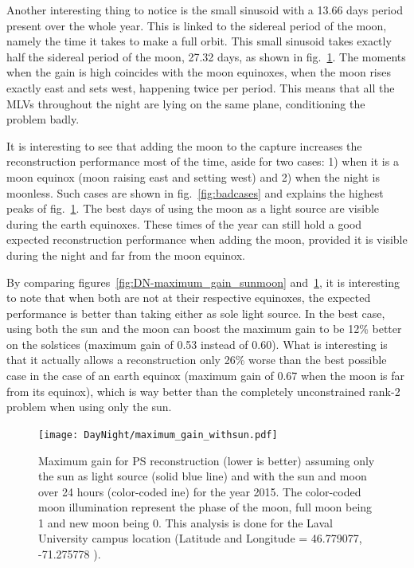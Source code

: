 Another interesting thing to notice is the small sinusoid with a 13.66 days period present over the whole year. This is linked to the sidereal period of the moon, namely the time it takes to make a full orbit. This small sinusoid takes exactly half the sidereal period of the moon, 27.32 days, as shown in fig.~\ref{fig:DN-maximum_gain}. The moments when the gain is high coincides with the moon equinoxes, when the moon rises exactly east and sets west, happening twice per period. This means that all the MLVs throughout the night are lying on the same plane, conditioning the problem badly.

It is interesting to see that adding the moon to the capture increases the reconstruction performance most of the time, aside for two cases: 1) when it is a moon equinox (moon raising east and setting west) and 2) when the night is moonless. Such cases are shown in fig.~\ref{fig:badcases} and explains the highest peaks of fig.~\ref{fig:DN-maximum_gain}. The best days of using the moon as a light source are visible during the earth equinoxes. These times of the year can still hold a good expected reconstruction performance when adding the moon, provided it is visible during the night and far from the moon equinox.

By comparing figures~\ref{fig:DN-maximum_gain_sunmoon} and~\ref{fig:DN-maximum_gain}, it is interesting to note that when both are not at their respective equinoxes, the expected performance is better than taking either as sole light source. In the best case, using both the sun and the moon can boost the maximum gain to be 12\% better on the solstices (maximum gain of 0.53 instead of 0.60). What is interesting is that it actually allows a reconstruction only 26\% worse than the best possible case in the case of an earth equinox (maximum gain of 0.67 when the moon is far from its equinox), which is way better than the completely unconstrained rank-2 problem when using only the sun.

\begin{figure}
\centering
\texttt{[image: DayNight/maximum\_gain\_withsun.pdf]}
\caption{Maximum gain for PS reconstruction (lower is better) assuming only the sun as light source (solid blue line) and with the sun and moon over 24 hours (color-coded ine) for the year 2015. The color-coded moon illumination represent the phase of the moon, full moon being 1 and new moon being 0. This analysis is done for the Laval University campus location (Latitude and Longitude = 46.779077, -71.275778 ).}
\label{fig:DN-maximum_gain}
\end{figure}

